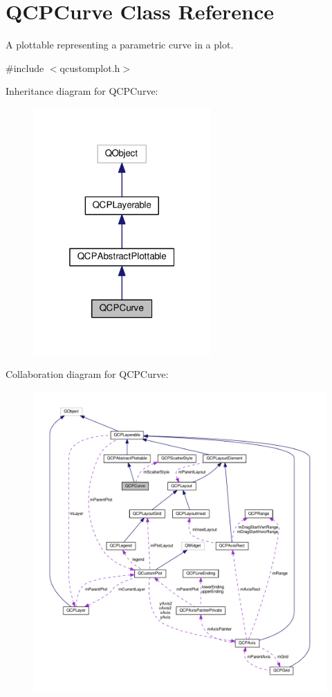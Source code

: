 \hypertarget{classQCPCurve}{}\section{Q\+C\+P\+Curve Class Reference}
\label{classQCPCurve}


A plottable representing a parametric curve in a plot.  




{\ttfamily \#include $<$qcustomplot.\+h$>$}



Inheritance diagram for Q\+C\+P\+Curve\+:
\nopagebreak
\begin{figure}[H]
\begin{center}
\leavevmode
\includegraphics[width=193pt]{classQCPCurve__inherit__graph}
\end{center}
\end{figure}


Collaboration diagram for Q\+C\+P\+Curve\+:
\nopagebreak
\begin{figure}[H]
\begin{center}
\leavevmode
\includegraphics[width=350pt]{classQCPCurve__coll__graph}
\end{center}
\end{figure}
